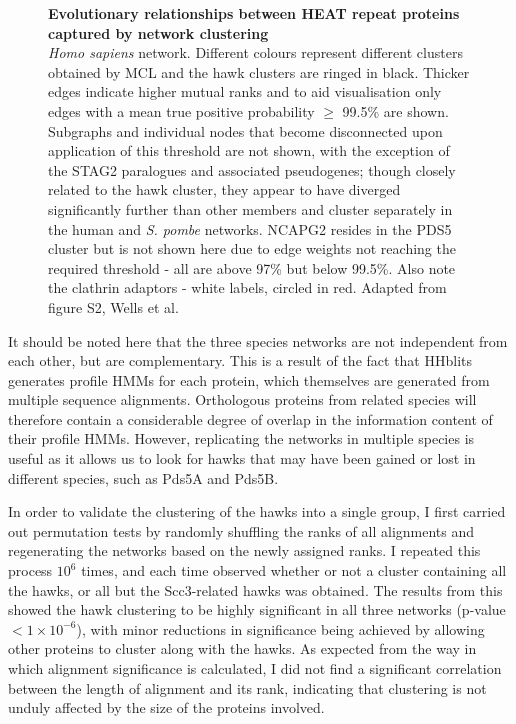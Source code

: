 \documentclass[a4paper,11pt,twoside,openright]{scrbook}
\begin{document}
\begin{figure}[h]
    \caption[Evolutionary relationships between HEAT repeat proteins captured by network clustering]{\sffamily \textbf{Evolutionary relationships between HEAT repeat proteins captured by network clustering} \\ \small  \textit{Homo sapiens} network. Different colours represent different clusters obtained by MCL and the hawk clusters are ringed in black. Thicker edges indicate higher mutual ranks and to aid visualisation only edges with a mean true positive probability $\geq$ 99.5\% are shown. Subgraphs and individual nodes that become disconnected upon application of this threshold are not shown, with the exception of the STAG2 paralogues and associated pseudogenes; though closely related to the hawk cluster, they appear to have diverged significantly further than other members and cluster separately in the human and \textit{S. pombe} networks. NCAPG2 resides in the PDS5 cluster but is not shown here due to edge weights not reaching the required threshold - all are above 97\% but below 99.5\%. Also note the clathrin adaptors - white labels, circled in red. Adapted from figure S2, Wells et al. \cite{Wells2017}}
    \label{figure:clustering}
\end{figure}

It should be noted here that the three species networks are not independent from each other, but are complementary. This is a result of the fact that HHblits generates profile HMMs for each protein, which themselves are generated from multiple sequence alignments. Orthologous proteins from related species will therefore contain a considerable degree of overlap in the information content of their profile HMMs. However, replicating the networks in multiple species is useful as it allows us to look for hawks that may have been gained or lost in different species, such as Pds5A and Pds5B.

In order to validate the clustering of the hawks into a single group, I first carried out permutation tests by randomly shuffling the ranks of all alignments and regenerating the networks based on the newly assigned ranks. I repeated this process $10^{6}$ times, and each time observed whether or not a cluster containing all the hawks, or all but the Scc3-related hawks was obtained. The results from this showed the hawk clustering to be highly significant in all three networks (p-value $< 1 \times 10^{-6}$), with minor reductions in significance being achieved by allowing other proteins to cluster along with the hawks. As expected from the way in which alignment significance is calculated, I did not find a significant correlation between the length of alignment and its rank, indicating that clustering is not unduly affected by the size of the proteins involved.
\end{document}
